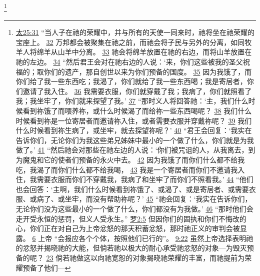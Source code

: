 \documentclass[12pt, a4paper, oneside]{ctexart}
\begin{document}
	\footnote {
		\href{https://biblehub.com/matthew/25-31.htm}{太25:31} “当人子在祂的荣耀中，并与所有的天使一同来时，祂将坐在祂荣耀的宝座上。
		\href{https://biblehub.com/matthew/25-32.htm}{32} 万邦都会被聚集在祂之前，而祂会将子民与另外的分离，如同牧羊人将绵羊从山羊中分离。
		\href{https://biblehub.com/matthew/25-33.htm}{33} 祂会将绵羊放置在祂的右边，而将山羊放置在祂的左边。
		\href{https://biblehub.com/matthew/25-34.htm}{34} “然后君王会对在祂右边的人说：‘来，你们这些被我的圣父祝福的；取你们的遗产，那自创世以来为你们预备的国度。
		\href{https://biblehub.com/matthew/25-35.htm}{35} 因为我饿了，而你们给了我一些东西吃；我渴了，你们就给了我一些东西喝；我是寄居者，你们邀请了我入住。
		\href{https://biblehub.com/matthew/25-36.htm}{36} 我需要衣服，你们就穿戴了我；我病了，你们就照看了我；我坐牢了，你们就来探望了我。’
		\href{https://biblehub.com/matthew/25-37.htm}{37} “那时义人将回答祂：‘主，我们什么时候看到祢饿了而喂养祢，或什么时候渴了而给祢一些东西喝呢？
		\href{https://biblehub.com/matthew/25-38.htm}{38} 我们什么时候看到祢是一位寄居者而邀请祢入住，或者需要衣服并穿戴祢呢？
		\href{https://biblehub.com/matthew/25-39.htm}{39} 我们什么时候看到祢生病了，或坐牢，就去探望祢呢？’
		\href{https://biblehub.com/matthew/25-40.htm}{40} “君王会回复：‘我实在告诉你们，无论你们为我这些弟兄姊妹中最小的一个做了什么，你们就是为我做了。’
		\href{https://biblehub.com/matthew/25-41.htm}{41} “然后祂会对那些在祂左边的人说：‘你们被咒诅的人，从我离去，到为魔鬼和它的使者们预备的永火中去。
		\href{https://biblehub.com/matthew/25-42.htm}{42} 因为我饿了而你们什么都不给我吃，我渴了而你们什么都不给我喝，
		\href{https://biblehub.com/matthew/25-43.htm}{43} 我是一个寄居者而你们不邀请我入住，我需要衣服而你们不穿戴我，我病了和坐牢了而你们不照看我。’
		\href{https://biblehub.com/matthew/25-44.htm}{44} “他们也会回答：‘主啊，我们什么时候看到祢饿了、或渴了、或是寄居者、或需要衣服、或病了、或坐牢，而没有帮助祢呢？’
		\href{https://biblehub.com/matthew/25-45.htm}{45} “祂会回复：‘我实在告诉你们，无论你们没为这些最小的一个做了什么，你们都没有为我做。’
		\href{https://biblehub.com/matthew/25-46.htm}{46} “那时他们会走开受永恒的惩罚，但义人受永生。”
		\href{https://biblehub.com/romans/2-5.htm}{罗2:5} 但因你们的固执和你们不悔改的心，你们正在对自己为上帝忿怒的那天积蓄忿怒，那时祂正义的审判会被显露。
		\href{https://biblehub.com/romans/2-6.htm}{6} 上帝 “会报应各个个体，按照他们已行的”。
		\href{https://biblehub.com/romans/9-22.htm}{9:22} 虽然上帝选择表明祂的忿怒并揭晓祂的大能，但倘若祂以极大的耐心承受祂忿怒的对象---为毁灭预备的呢？
		\href{https://biblehub.com/romans/9-23.htm}{23} 倘若祂做这以向祂宽恕的对象揭晓祂荣耀的丰富，而祂提前为荣耀预备了他们---
}
\end{document}
